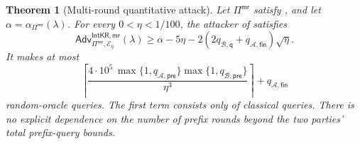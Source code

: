 \documentclass[11pt]{article}
\newtheorem{theorem}{Theorem}[section]
\newcommand{\cA}{\mathcal{A}}
\newcommand{\cB}{\mathcal{B}}
\newcommand{\cE}{\mathcal{E}}
\newcommand{\IntKR}{\mathsf{IntKR}}
\newcommand{\Adv}{\mathsf{Adv}}
\begin{document}
\begin{theorem}[Multi-round quantitative attack]
\label{thm:multi-main}
Let \(\Pi^{\mathsf{mr}}\) satisfy
, and let
\(\alpha=\alpha_{\Pi^{\mathsf{mr}}}(\lambda)\).  For every
\(0<\eta<1/100\), the attacker of  satisfies
\[
  \Adv^{\IntKR,\mathsf{mr}}_{
    \Pi^{\mathsf{mr}},\cE_\eta}(\lambda)
  \ge
  \alpha
  -5\eta
  -2(2q_{\cB,\mathsf q}+q_{\cA,\mathsf{fin}})\sqrt\eta.
\]
It makes at most
\[
  \left\lceil
    \frac{4\cdot 10^5\,
      \max\{1,q_{\cA,\mathsf{pre}}\}
      \max\{1,q_{\cB,\mathsf{pre}}\}}
      {\eta^3}
  \right\rceil
  +q_{\cA,\mathsf{fin}}
\]
random-oracle queries.  The first term consists only of classical queries.
There is no explicit dependence on the number of prefix rounds beyond the
two parties' total prefix-query bounds.
\end{theorem}
\end{document}

